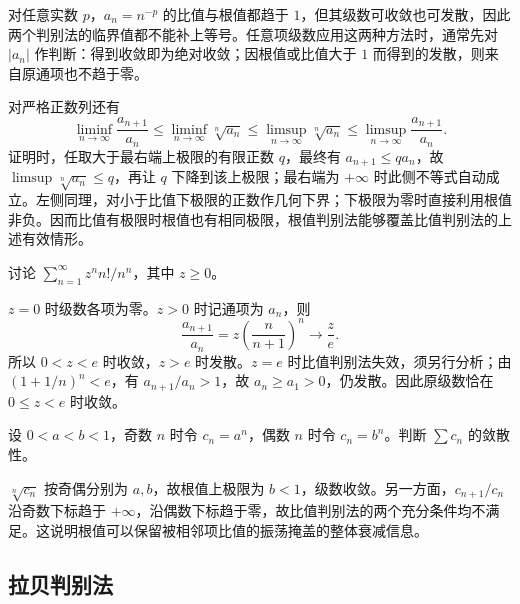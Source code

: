 \documentclass[UTF8,12pt,a4paper,fontset=fandol]{ctexbook}
\begin{document}
对任意实数 $p$，$a_n=n^{-p}$ 的比值与根值都趋于 $1$，但其级数可收敛也可发散，因此两个判别法的临界值都不能补上等号。任意项级数应用这两种方法时，通常先对 $|a_n|$ 作判断：得到收敛即为绝对收敛；因根值或比值大于 $1$ 而得到的发散，则来自原通项也不趋于零。

对严格正数列还有
\begin{equation}
    \liminf_{n\to\infty}\frac{a_{n+1}}{a_n}
    \leq\liminf_{n\to\infty}\sqrt[n]{a_n}
    \leq\limsup_{n\to\infty}\sqrt[n]{a_n}
    \leq\limsup_{n\to\infty}\frac{a_{n+1}}{a_n}.
    \label{eq:series-ratio-root-limits}
\end{equation}
证明时，任取大于最右端上极限的有限正数 $q$，最终有 $a_{n+1}\leq qa_n$，故 $\limsup\sqrt[n]{a_n}\leq q$，再让 $q$ 下降到该上极限；最右端为 $+\infty$ 时此侧不等式自动成立。左侧同理，对小于比值下极限的正数作几何下界；下极限为零时直接利用根值非负。因而比值有极限时根值也有相同极限，根值判别法能够覆盖比值判别法的上述有效情形。

\begin{example}
\label{ex:factorial-power-ratio-test}
讨论 $\sum_{n=1}^{\infty}z^nn!/n^n$，其中 $z\geq0$。
\end{example}

\begin{solve}
$z=0$ 时级数各项为零。$z>0$ 时记通项为 $a_n$，则
\[
    \frac{a_{n+1}}{a_n}=z\left(\frac n{n+1}\right)^n\longrightarrow\frac ze.
\]
所以 $0<z<e$ 时收敛，$z>e$ 时发散。$z=e$ 时比值判别法失效，须另行分析；由 $(1+1/n)^n<e$，有 $a_{n+1}/a_n>1$，故 $a_n\geq a_1>0$，仍发散。因此原级数恰在 $0\leq z<e$ 时收敛。
\end{solve}

\begin{example}
\label{ex:root-test-with-oscillating-ratios}
设 $0<a<b<1$，奇数 $n$ 时令 $c_n=a^n$，偶数 $n$ 时令 $c_n=b^n$。判断 $\sum c_n$ 的敛散性。
\end{example}

\begin{solve}
$\sqrt[n]{c_n}$ 按奇偶分别为 $a,b$，故根值上极限为 $b<1$，级数收敛。另一方面，$c_{n+1}/c_n$ 沿奇数下标趋于 $+\infty$，沿偶数下标趋于零，故比值判别法的两个充分条件均不满足。这说明根值可以保留被相邻项比值的振荡掩盖的整体衰减信息。
\end{solve}

\subsection{拉贝判别法}
\label{subsec:raabe-test}
\end{document}
